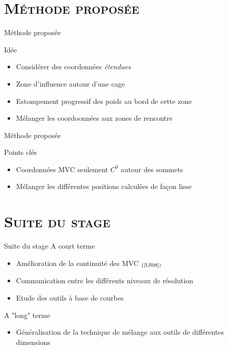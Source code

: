 \documentclass[xcolor=x11names,compress]{beamer}
\renewcommand{\(}{\begin{columns}} \renewcommand{\)}{\end{columns}}
\newcommand{\<}[1]{\begin{column}{#1}} \renewcommand{\>}{\end{column}}
\begin{document}
\section{\scshape Méthode proposée}

\begin{frame}{Méthode proposée}
  \begin{block}{Idée}
    \begin{itemize}
    \item Considérer des coordonnées \textit{étendues}
    \item Zone d'influence autour d'une cage
    \item Estompement progressif des poids au bord de cette zone
    \item Mélanger les coordoonnées aux zones de rencontre
    \end{itemize}
  \end{block}
\end{frame}

\begin{frame}{Méthode proposée}
  \begin{alertblock}{Points clés}
    \begin{itemize}
    \item Coordonnées MVC seulement $C^0$ autour des sommets
    \item Mélanger les différentes positions calculées de façon lisse
    \end{itemize}
  \end{alertblock}
\end{frame}

\section{\scshape Suite du stage}
\begin{frame}{Suite du stage}
  A court terme
  \begin{itemize}
  \item Amélioration de la continuité des MVC
    $_{(\text{\cite{LS08}})}$
  \item Communication entre les différents niveaux de résolution
  \item Etude des outils à base de courbes
  \end{itemize}
  A "long" terme
  \begin{itemize}
  \item Généralisation de la technique de mélange aux outils de
    différentes dimensions
  \end{itemize}
\end{frame}

\appendix
\end{document}

